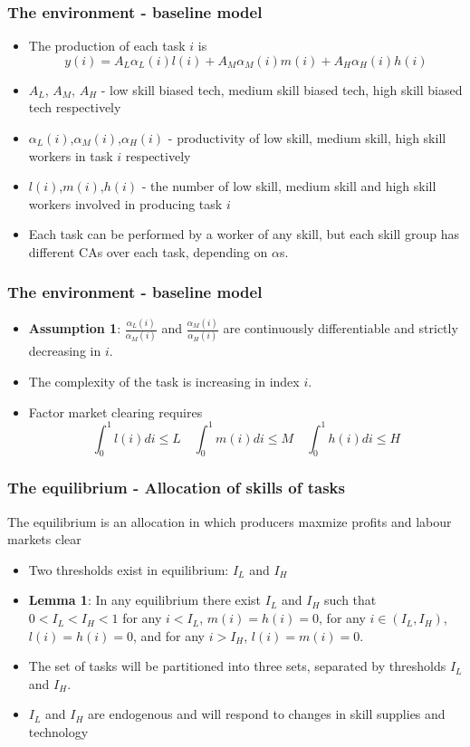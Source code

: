 \documentclass[mathserif]{beamer}
\begin{document}
\begin{frame}
\frametitle{The environment - baseline model}
\begin{itemize}
\item The production of each task $i$ is
\begin{equation*}
y(i)=A_L\alpha_L(i)l(i)+A_M\alpha_M(i)m(i)+A_H\alpha_H(i)h(i)
\end{equation*}
\item $A_L$, $A_M$, $A_H$ - low skill biased tech,  medium skill biased tech,  high skill biased tech respectively
\item $\alpha_L(i)$,$\alpha_M(i)$,$\alpha_H(i)$ - productivity of low skill, medium skill, high skill workers in task $i$ respectively
\item $l(i)$,$m(i)$,$h(i)$ - the number of low skill, medium skill and high skill workers involved in producing task $i$
\item Each task can be performed by a worker of any skill, but each skill group has different CAs over each task, depending on $\alpha$s.
\end{itemize}
\end{frame}
\begin{frame}
\frametitle{The environment - baseline model}
\begin{itemize}
\item \textbf{Assumption 1}: $\frac{\alpha_L(i)}{\alpha_M(i)}$ and $\frac{\alpha_M(i)}{\alpha_H(i)}$ are continuously differentiable and strictly decreasing in $i$.
\item The complexity of the task is increasing in index $i$.
\item Factor market clearing requires
\begin{equation*}
\int_0^1l(i)di\leq L \quad \int_0^1m(i)di\leq M \quad \int_0^1h(i)di\leq H
\end{equation*}
\end{itemize}
\end{frame}
\begin{frame}
\frametitle{The equilibrium - Allocation of skills of tasks}
The equilibrium is an allocation in which producers maxmize profits and labour markets clear
\begin{itemize}
\item Two thresholds exist in equilibrium: $I_L$ and $I_H$
\item \textbf{Lemma 1}: In any equilibrium there exist $I_L$ and $I_H$ such that $0<I_L<I_H<1$ for any $i<I_L$, $m(i)=h(i)=0$, for any $i\in (I_L,I_H)$, $l(i)=h(i)=0$, and for any $i>I_H$, $l(i)=m(i)=0$.
\item The set of tasks will be partitioned into three sets, separated by thresholds $I_L$ and $I_H$.
\item $I_L$ and $I_H$ are endogenous and will respond to changes in skill supplies and technology
\end{itemize}
\end{frame}
\end{document}
